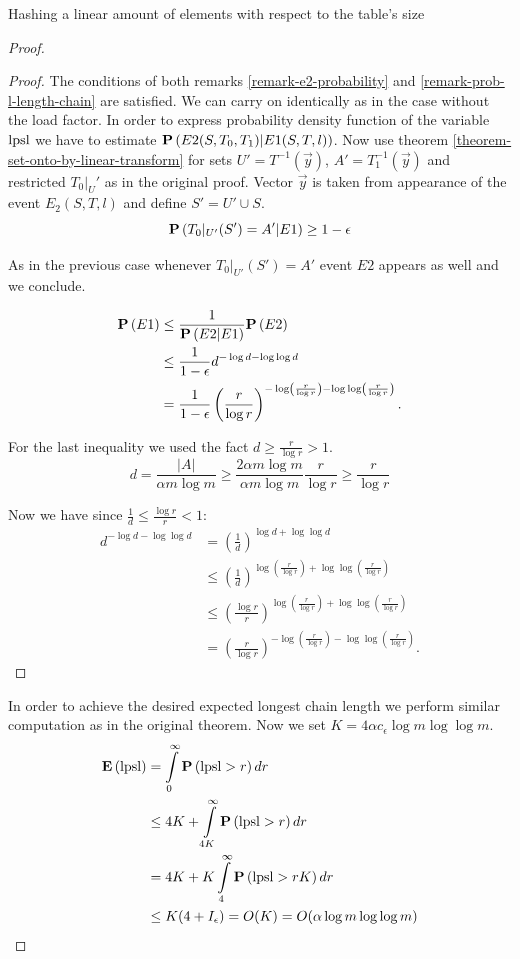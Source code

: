 \begin{section}{Hashing a linear amount of elements with respect to the table's size}
\begin{proof}
\begin{proof}
The conditions of both remarks \ref{remark-e2-probability} and \ref{remark-prob-l-length-chain} are satisfied. We can carry on identically as in the case without the load factor. In order to express probability density function of the variable $\mathrm{lpsl}$ we have to estimate $\mathbf{P}\left(E2(S, T_0, T_1)|E1(S, T, l)\right)$. Now use theorem \ref{theorem-set-onto-by-linear-transform} for sets $U' = T^{-1}(\vec{y})$, $A' = T_1^{-1}(\vec{y})$ and restricted $T_0|_U'$ as in the original proof. Vector $\vec{y}$ is taken from appearance of the event $E_2(S, T, l)$ and define $S' = U' \cup S$.
\[
	\mathbf{P}\left(T_0|_{U'}(S') = A' | E1\right) \geq 1 - \epsilon
\]

As in the previous case whenever $T_0|_{U'}(S') = A'$ event $E2$ appears as well and we conclude.

\[
\begin{split}
\mathbf{P}\left(E1\right) 
	& \leq \frac{1}{\mathbf{P}\left(E2|E1\right)}{\mathbf{P}\left(E2\right)} \\
	& \leq \frac{1}{1 - \epsilon} d ^ {-\log d - \log \log d} \\
	& = \frac{1}{1 - \epsilon} \left(\frac{r}{\log r}\right)^{-\log \left(\frac{r}{\log r}\right) - \log \log \left(\frac{r}{\log r}\right)} \text{.}
\end{split}
\]

For the last inequality we used the fact $d \geq \frac{r}{\log r} > 1$.
\[
	d = \frac{|A|}{\alpha m \log m} \geq \frac{2 \alpha m \log m}{\alpha m \log m} \frac{r}{\log r} \geq \frac{r}{\log r}
\]

Now we have since $\frac{1}{d} \leq \frac{\log r}{r} < 1$:
\[
\begin{split}
d ^ {-\log d - \log \log d} 
	& = \left(\frac{1}{d}\right) ^ {\log d + \log \log d} \\
	& \leq \left(\frac{1}{d}\right) ^ {\log \left(\frac{r}{\log r}\right) + \log \log
 \left(\frac{r}{\log r}\right)} \\
	& \leq \left(\frac{\log r}{r}\right) ^ {\log \left(\frac{r}{\log r}\right) + \log \log
 \left(\frac{r}{\log r}\right)} \\
	& = \left(\frac{r}{\log r}\right)^{-\log \left(\frac{r}{\log r}\right) - \log \log \left(\frac{r}{\log r}\right)} \text{.}
\end{split}
\]
\end{proof}

In order to achieve the desired expected longest chain length we perform similar computation as in the original theorem. Now we set $K = 4 \alpha c_\epsilon \log m \log \log m$.
\[
\begin{split}
\mathbf{E}\left(\mathrm{lpsl}\right)
	& = \int\limits_0^\infty \mathbf{P}\left(\mathrm{lpsl} > r\right) dr \\
	& \leq 4K + \int\limits_{4K}^\infty \mathbf{P}\left(\mathrm{lpsl} > r\right) dr \\
	& = 4K + K\int\limits_4^\infty \mathbf{P}\left(\mathrm{lpsl} > rK\right) dr \\
	& \leq K(4 + I_\epsilon) = O(K) = O(\alpha \log m \log \log m)
\end{split}
\]
\end{proof}
\end{section}
